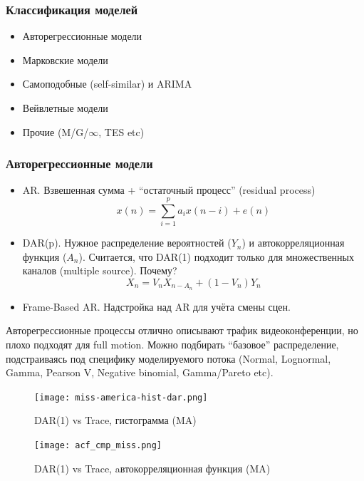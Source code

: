 \documentclass[10pt,pdf,hyperref={unicode}]{beamer}
\begin{document}
\begin{frame}
    \frametitle{Классификация моделей}
    \begin{itemize}
        \item Авторегрессионные модели
        \item Марковские модели
        \item Самоподобные (self-similar) и ARIMA
        \item Вейвлетные модели
        \item Прочие (M/G/$\infty$, TES etc)
    \end{itemize}
\end{frame}

\begin{frame}
    \frametitle{Авторегрессионные модели}
    \begin{itemize}
        \item AR. Взвешенная сумма + ``остаточный процесс'' (residual process)
        $$
            x(n) = \sum_{i=1}^{p}{a_i x(n - i)} + e(n)
        $$
        \item DAR(p). Нужное распределение вероятностей ($Y_n$) и автокорреляционная
            функция ($A_n$). Считается, что DAR(1) подходит только для множественных
            каналов (multiple source). Почему?
        $$
            X_n = V_nX_{n - A_n} + (1 - V_n) Y_n
        $$
        \item Frame-Based AR. Надстройка над AR для учёта смены сцен.
    \end{itemize}

    Авторегрессионные процессы отлично описывают трафик видеоконференции,
    но плохо подходят для full motion. Можно подбирать ``базовое'' распределение,
    подстраиваясь под специфику моделируемого потока (Normal, Lognormal, Gamma,
    Pearson V, Negative binomial, Gamma/Pareto etc).
\end{frame}

\begin{frame}
    \begin{figure}[h]
        \begin{center}
            \texttt{[image: miss-america-hist-dar.png]}
        \end{center}
        \caption{DAR(1) vs Trace, гистограмма (MA)}
        \label{fig:hist_cmp_miss}
    \end{figure}
\end{frame}

\begin{frame}
    \begin{figure}[h]
        \begin{center}
            \texttt{[image: acf\_cmp\_miss.png]}
        \end{center}
        \caption{DAR(1) vs Trace, aвтокорреляционная функция (MA)}
        \label{fig:acf_cmp_miss}
    \end{figure}
\end{frame}
\end{document}

